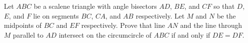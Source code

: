 Let $ABC$ be a scalene triangle with angle bisectors $AD$,  $BE$,  and $CF$ so that $D$,  $E$,  and $F$ lie on segments $BC$,  $CA$,  and $AB$ respectively. Let $M$ and $N$ be the midpoints of $BC$ and $EF$ respectively. Prove that line $AN$ and the line through $M$ parallel to $AD$ intersect on the circumcircle of $ABC$ if and only if $DE=DF$.